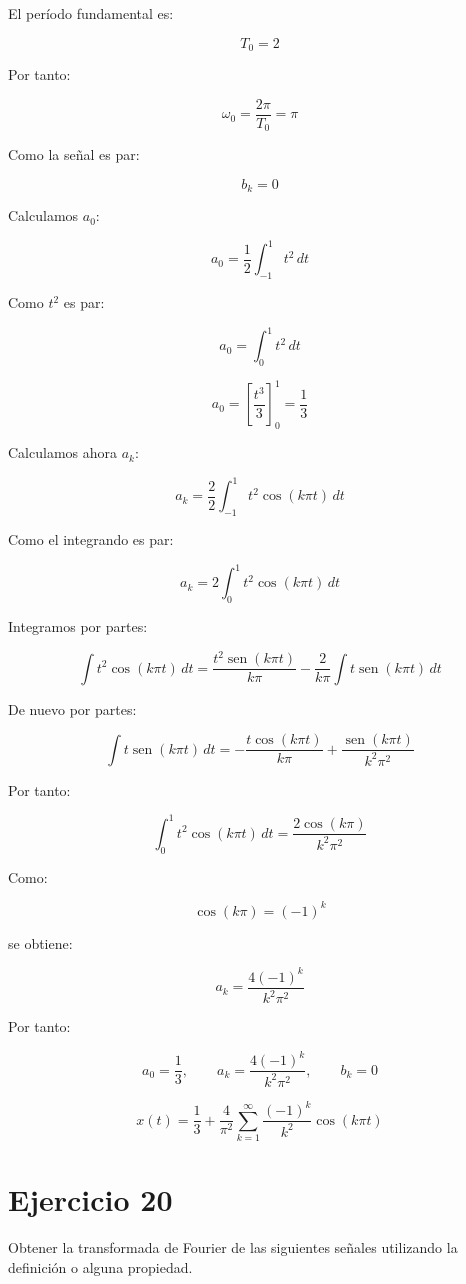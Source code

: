 \documentclass[fleqn]{article}
\DeclareMathOperator{\sen}{sen}
\begin{document}
	El período fundamental es:

	\[
	T_0=2
	\]

	Por tanto:

	\[
	\omega_0
	=
	\frac{2\pi}{T_0}
	=
	\pi
	\]

	Como la señal es par:

	\[
	b_k=0
	\]

	Calculamos $a_0$:

	\[
	a_0
	=
	\frac{1}{2}
	\int_{-1}^{1}
	t^2\,dt
	\]

	Como $t^2$ es par:

	\[
	a_0
	=
	\int_0^1 t^2\,dt
	\]

	\[
	a_0
	=
	\left[
	\frac{t^3}{3}
	\right]_0^1
	=
	\frac{1}{3}
	\]

	Calculamos ahora $a_k$:

	\[
	a_k
	=
	\frac{2}{2}
	\int_{-1}^{1}
	t^2\cos(k\pi t)\,dt
	\]

	Como el integrando es par:

	\[
	a_k
	=
	2
	\int_0^1
	t^2\cos(k\pi t)\,dt
	\]

	Integramos por partes:

	\[
	\int
	t^2\cos(k\pi t)\,dt
	=
	\frac{t^2\sen(k\pi t)}{k\pi}
	-
	\frac{2}{k\pi}
	\int
	t\sen(k\pi t)\,dt
	\]

	De nuevo por partes:

	\[
	\int
	t\sen(k\pi t)\,dt
	=
	-\frac{t\cos(k\pi t)}{k\pi}
	+
	\frac{\sen(k\pi t)}{k^2\pi^2}
	\]

	Por tanto:

	\[
	\int_0^1
	t^2\cos(k\pi t)\,dt
	=
	\frac{2\cos(k\pi)}{k^2\pi^2}
	\]

	Como:

	\[
	\cos(k\pi)=(-1)^k
	\]

	se obtiene:

	\[
	a_k
	=
	\frac{4(-1)^k}{k^2\pi^2}
	\]

	Por tanto:

	\[
	\boxed{
	a_0=\frac{1}{3},
	\qquad
	a_k=\frac{4(-1)^k}{k^2\pi^2},
	\qquad
	b_k=0
	}
	\]

	\[
	\boxed{
	x(t)
	=
	\frac{1}{3}
	+
	\frac{4}{\pi^2}
	\sum_{k=1}^{\infty}
	\frac{(-1)^k}{k^2}
	\cos(k\pi t)
	}
	\]

\section{Ejercicio 20}
	Obtener la transformada de Fourier de las siguientes señales utilizando la definición o alguna propiedad.
\end{document}
